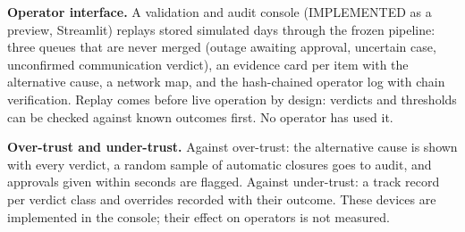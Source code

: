 \textbf{Operator interface.} A validation and audit console (IMPLEMENTED as a preview, Streamlit)
replays stored simulated days through the frozen pipeline: three queues that are never merged (outage
awaiting approval, uncertain case, unconfirmed communication verdict), an evidence card per item with
the alternative cause, a network map, and the hash-chained operator log with chain verification.
Replay comes before live operation by design: verdicts and thresholds can be checked against known
outcomes first. No operator has used it.

\textbf{Over-trust and under-trust.} Against over-trust: the alternative cause is shown with every
verdict, a random sample of automatic closures goes to audit,
and approvals given within seconds are flagged. Against under-trust: a track record per verdict class
and overrides recorded with their outcome. These devices are implemented in the console; their effect
on operators is not measured.
